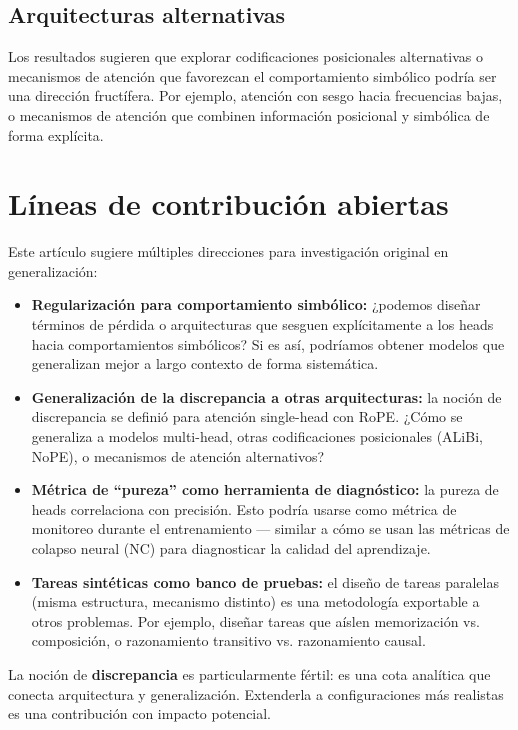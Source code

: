 \documentclass[12pt,a4paper,oneside]{report}
\begin{document}
\subsection{Arquitecturas alternativas}

Los resultados sugieren que explorar codificaciones posicionales alternativas o mecanismos de atención que favorezcan el comportamiento simbólico podría ser una dirección fructífera. Por ejemplo, atención con sesgo hacia frecuencias bajas, o mecanismos de atención que combinen información posicional y simbólica de forma explícita.

\section{Líneas de contribución abiertas}

Este artículo sugiere múltiples direcciones para investigación original en generalización:

\begin{itemize}
    \item \textbf{Regularización para comportamiento simbólico:} ¿podemos diseñar términos de pérdida o arquitecturas que sesguen explícitamente a los heads hacia comportamientos simbólicos? Si es así, podríamos obtener modelos que generalizan mejor a largo contexto de forma sistemática.
    \item \textbf{Generalización de la discrepancia a otras arquitecturas:} la noción de discrepancia se definió para atención single-head con RoPE. ¿Cómo se generaliza a modelos multi-head, otras codificaciones posicionales (ALiBi, NoPE), o mecanismos de atención alternativos?
    \item \textbf{Métrica de ``pureza'' como herramienta de diagnóstico:} la pureza de heads correlaciona con precisión. Esto podría usarse como métrica de monitoreo durante el entrenamiento — similar a cómo se usan las métricas de colapso neural (NC) para diagnosticar la calidad del aprendizaje.
    \item \textbf{Tareas sintéticas como banco de pruebas:} el diseño de tareas paralelas (misma estructura, mecanismo distinto) es una metodología exportable a otros problemas. Por ejemplo, diseñar tareas que aíslen memorización vs. composición, o razonamiento transitivo vs. razonamiento causal.
\end{itemize}

La noción de \textbf{discrepancia} es particularmente fértil: es una cota analítica que conecta arquitectura y generalización. Extenderla a configuraciones más realistas es una contribución con impacto potencial.
\end{document}
